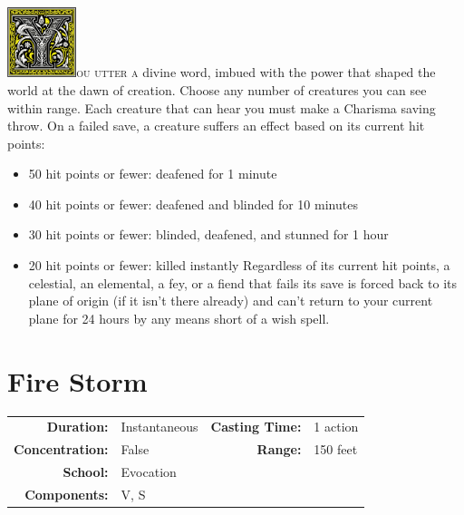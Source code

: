 \documentclass[12pt,showtrims]{memoir}
\begin{document}
\vspace{1\baselineskip}\noindent
\lettrine[lines=4]{\includegraphics[height=58pt]{initials/Y.png}}{ou utter a} divine word, imbued with the power that shaped the world at the dawn of creation. Choose any number of creatures you can see within range. Each creature that can hear you must make a Charisma saving throw. On a failed save, a creature suffers an effect based on its current hit points:
\begin{itemize}
    \item 50 hit points or fewer: deafened for 1 minute
    \item 40 hit points or fewer: deafened and blinded for 10 minutes
    \item 30 hit points or fewer: blinded, deafened, and stunned for 1 hour
    \item 20 hit points or fewer: killed instantly Regardless of its current hit points, a celestial, an elemental, a fey, or a fiend that fails its save is forced back to its plane of origin (if it isn't there already) and can't return to your current plane for 24 hours by any means short of a wish spell.
\end{itemize}


\newpage
\section*{Fire Storm}

{
\small\centering\vspace{-6pt}
\begin{tabular}{rlrl}
\toprule

\textbf{Duration:} & Instantaneous &
\textbf{Casting Time:} & 1 action \\
\textbf{Concentration:} & False &
\textbf{Range:} & 150 feet \\
\textbf{School:} & Evocation \\
\textbf{Components:} & \multicolumn{3}{p{0.7\textwidth}}{V, S}\\

\bottomrule
\end{tabular}
}
\end{document}
